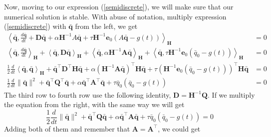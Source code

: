 \documentclass{article}
\theoremstyle{definition}
\begin{document}
    
    Now, moving to our expression (\ref{semidiscrete}), we will make sure that 
    our numerical solution is stable. With abuse of notation, multiply expression (\ref{semidiscrete}) 
    with $\bar{\mathbf{q}}$ from the left, we get 
    \begin{align}
        \left\langle \bar{\mathbf{q}}, \frac{d\bar{\mathbf{q}}}{dt} 
                + \mathbf{D}{\bar{\mathbf{q}}} + \alpha \mathbf{H}^{-1}A{\bar{\mathbf{q}}} 
                + \tau \mathbf{H}^{-1} \mathbf{e}_0(A{\bar{\mathbf{q}}}  - g(t))\right\rangle_\mathbf{H} &= 0 \\
        \left\langle \bar{\mathbf{q}}, \frac{d\bar{\mathbf{q}}}{dt} \right\rangle_\mathbf{H} 
                + \left\langle \bar{\mathbf{q}},  \mathbf{D}{\bar{\mathbf{q}}} \right\rangle_\mathbf{H} 
                +\left\langle \bar{\mathbf{q}}, \alpha \mathbf{H}^{-1}\mathbf{A}{\bar{\mathbf{q}}} \right\rangle_\mathbf{H}
                +\left\langle \bar{\mathbf{q}}, \tau \mathbf{H}^{-1} \mathbf{e}_0(\bar{{q}}_0  - g(t))\right\rangle_\mathbf{H} &=0 \\
        \frac12 \frac{d}{dt}\left\langle \bar{\mathbf{q}}, \bar{\mathbf{q}} \right\rangle_\mathbf{H} 
                + \bar{\mathbf{q}}^\top \mathbf{D}^\top \mathbf{H}\bar{\mathbf{q}}
                + \alpha(\mathbf{H}^{-1}\mathbf{A}\bar{\mathbf{q}})^\top \mathbf{H}\bar{\mathbf{q}}
                +\tau (\mathbf{H}^{-1} \mathbf{e}_0(\bar{{q}}_0  - g(t)))^\top \mathbf{H}\bar{\mathbf{q}} &=0 \\
        \frac12\frac{d}{dt} \| \bar{\mathbf{q}}  \|^2 
                + \bar{\mathbf{q}}^\top \mathbf{Q}^\top \bar{\mathbf{q}} 
                + \alpha \bar{\mathbf{q}}^\top \mathbf{A}^\top \bar{\mathbf{q}} + \tau \bar{{q}}_0(\bar{{q}}_0 - g(t)) &=0 
    \end{align}
    The third row to fourth row use the following identity, $\mathbf{D}=\mathbf{H}^{-1}\mathbf{Q}$. 
    If we multiply the equation from the right, with the same way we will get
    \[
        \frac12 \frac{d}{dt} \| \bar{\mathbf{q}}  \|^2 
            + \bar{\mathbf{q}}^\top \mathbf{Q}\bar{\mathbf{q}} 
            + \alpha \bar{\mathbf{q}}^\top \mathbf{A}\bar{\mathbf{q}} + \tau \bar{{q}}_0(\bar{{q}}_0 - g(t)) =0 
    \] 
    Adding both of them and remember that $\mathbf{A} = \mathbf{A}^\top $, we could get
\end{document}
